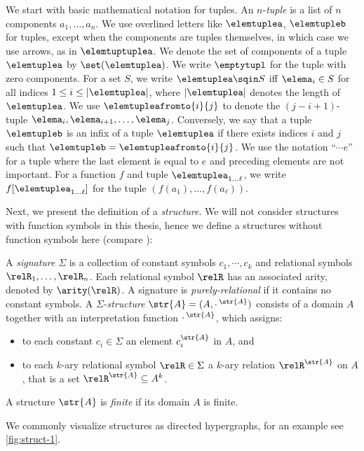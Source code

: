 We start with basic mathematical notation for tuples.
An $n$-\emph{tuple} is a list of $n$ components $a_{1}, \ldots{}, a_{n}$.
We use overlined letters like $\elemtuplea$, $\elemtupleb$ for tuples, except when the components are tuples themselves, in which case we use arrows, as in $\elemtuptuplea$.
We denote the set of components of a tuple $\elemtuplea$ by $\set(\elemtuplea)$.
We write $\emptytupl$ for the tuple with zero components.
For a set $S$, we write $\elemtuplea \sqin S$ iff $\elema_i \in S$ for all indices $1 \leq i \leq |\elemtuplea|$, where $|\elemtuplea|$ denotes the length of~$\elemtuplea$.
We use $\elemtupleafromto{i}{j}$ to denote the $(j{-}i{+}1)$-tuple $\elema_i, \elema_{i+1}, \ldots, \elema_j$.
Conversely, we say that a tuple $\elemtupleb$ is an infix of a tuple $\elemtuplea$ if there exists indices $i$ and $j$ such that $\elemtupleb = \elemtupleafromto{i}{j}$.
We use the notation ``$\cdots e$'' for a tuple where the last element is equal to $e$ and preceding elements are not important.
For a function $f$ and tuple $\elemtuplea_{1\ldots\ell}$, we write $f[\elemtuplea_{1\ldots\ell}]$ for the tuple $(f(a_{1}), \ldots, f(a_{\ell}))$.

Next, we present the definition of a \emph{structure}.
We will not consider structures with function symbols in this thesis, hence we define a structures without function symbols here (compare \cite[Definition 2.1]{Libkin04}):
\begin{definition}[Structures]
  A \emph{signature} $\Sigma$ is a collection of constant symbols $c_{1}, \cdots, c_{k}$ and relational symbols $\relR_{1}, \ldots, \relR_{n}$.
  Each relational symbol $\relR$ has an associated arity, denoted by $\arity(\relR)$.
  A signature is \emph{purely-relational} if it contains no constant symbols.
  A $\Sigma$-\emph{structure} $\str{A} = (A, {\cdot\,}^{\str{A}})$ consists of a domain $A$ together with an interpretation function ${\cdot\,}^{\str{A}}$, which assigns:
  \begin{itemize}
    \item to each constant $c_{i} \in \Sigma$ an element $c_{i}^{\str{A}}$ in $A$, and
    \item to each $k$-ary relational symbol $\relR \in \Sigma$ a $k$-ary relation $\relR^{\str{A}}$ on $A$, that is a set $\relR^{\str{A}} \subseteq A^{k}$.
  \end{itemize}
  A structure $\str{A}$ is \emph{finite} if its domain $A$ is finite.
\end{definition}
We commonly visualize structures as directed hypergraphs, for an example see \cref{fig:struct-1}.

